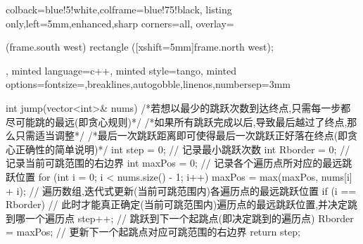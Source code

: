 \documentclass{article}
\begin{document}
\begin{homeworkProblem}
\begin{tcblisting}
{colback=blue!5!white,colframe=blue!75!black,
listing only,left=5mm,enhanced,sharp corners=all,
overlay={\begin{tcbclipinterior} (frame.south west)
rectangle ([xshift=5mm]frame.north west);\end{tcbclipinterior}},
minted language=c++,
minted style=tango,
minted options={fontsize=\small,breaklines,autogobble,linenos,numbersep=3mm}}
int jump(vector<int>& nums) {
    /*若想以最少的跳跃次数到达终点,只需每一步都尽可能跳的最远(即贪心规则)*/
    /*如果所有跳跃完成以后,导致最后越过了终点,那么只需适当调整*/
    /*最后一次跳跃距离即可使得最后一次跳跃正好落在终点(即贪心正确性的简单说明)*/
    int step = 0;    // 记录最小跳跃次数
    int Rborder = 0; // 记录当前可跳范围的右边界
    int maxPos = 0;  // 记录各个遍历点所对应的最远跳跃位置
    for (int i = 0; i < nums.size() - 1; i++) {
        maxPos = max(maxPos, nums[i] + i); // 遍历数组,迭代式更新(当前可跳范围内)各遍历点的最远跳跃位置
        if (i == Rborder) { // 此时才能真正确定(当前可跳范围内)遍历点的最远跳跃位置,并决定跳到哪一个遍历点
            step++; // 跳跃到下一个起跳点(即决定跳到的遍历点)
            Rborder = maxPos; // 更新下一个起跳点对应可跳范围的右边界
        }
    }
    return step;
}
\end{tcblisting}
\end{homeworkProblem}





\pagebreak
\end{document}
